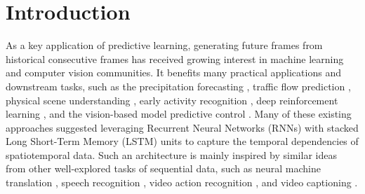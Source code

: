 \documentclass[10pt,journal,compsoc]{IEEEtran}
\begin{document}
\maketitle


\IEEEdisplaynontitleabstractindextext




\IEEEpeerreviewmaketitle






























\section{Introduction}

As a key application of predictive learning, generating future frames from historical consecutive frames has received growing interest in machine learning and computer vision communities. 
It benefits many practical applications and downstream tasks, such as the precipitation forecasting \cite{shi2015convolutional,wang2017predrnn}, traffic flow prediction \cite{xu2018predcnn,wang2019memory}, physical scene understanding \cite{wu2017learning,van2018relational,kipf2018neural,xu2019unsupervised}, early activity recognition \cite{wang2019eidetic}, deep reinforcement learning \cite{ha2018recurrent,hafner2018learning}, and the vision-based model predictive control \cite{finn2017deep,ebert2017self}.
Many of these existing approaches suggested leveraging Recurrent Neural Networks (RNNs) \cite{rumelhart1988learning,werbos1990backpropagation} with stacked Long Short-Term Memory (LSTM) units \cite{hochreiter1997long} to capture the temporal dependencies of spatiotemporal data.
Such an architecture is mainly inspired by similar ideas from other well-explored tasks of sequential data, such as neural machine translation \cite{Sutskever2011Generating,Cho2014On}, speech recognition \cite{Graves2014Towards}, video action recognition \cite{Ng15,donahue2015long}, and video captioning \cite{donahue2015long}.
\end{document}
